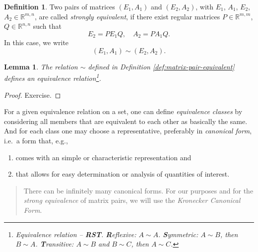 \documentclass[]{book}
\providecommand{\tightlist}{%
  \setlength{\itemsep}{0pt}\setlength{\parskip}{0pt}}
\newenvironment {JHSAYS} [0] {\begin{quote}\color{jhsc}} {\end{quote}}
\newtheorem{lemma}{Lemma}[chapter]
\theoremstyle{definition}
\newtheorem{definition}{Definition}[chapter]
\theoremstyle{definition}
\theoremstyle{definition}
\theoremstyle{remark}
\begin{document}
\begin{definition}
\protect\hypertarget{def:matrix-pair-equivalent}{}{\label{def:matrix-pair-equivalent} }Two pairs of matrices \((E_1, A_1)\) and \((E_2, A_2)\), with \(E_1\), \(A_1\), \(E_2\), \(A_2 \in \mathbb R^{m,n}\), are called \emph{strongly equivalent}, if there exist regular matrices \(P\in \mathbb R^{m,m}\), \(Q\in \mathbb R^{n,n}\) such that
\begin{equation*}
E_2 = PE_1Q, \quad A_2 = PA_1Q.
\end{equation*}
In this case, we write
\[(E_1, A_1) \sim (E_2, A_2).\]
\end{definition}

\begin{lemma}
\protect\hypertarget{lem:strong-equivalence-RSI}{}{\label{lem:strong-equivalence-RSI} }The relation \(\sim\) defined in Definition \ref{def:matrix-pair-equivalent} defines an equivalence relation\footnote{Equivalence relation -- \textbf{RST}. \textbf{R}eflexive: \(A\sim A\). \textbf{S}ymmetric: \(A\sim B\), then \(B\sim A\). \textbf{T}ransitive: \(A\sim B\) and \(B\sim C\), then \(A\sim C\).}.
\end{lemma}
\begin{proof}
{}Exercise.
\end{proof}

For a given equivalence relation on a set, one can define \emph{equivalence classes} by considering all members that are equivalent to each other as basically the same. And for each class one may choose a representative, preferably in \emph{canonical form}, i.e.~a form that, e.g.,

\begin{enumerate}
\def\labelenumi{\arabic{enumi}.}
\tightlist
\item
  comes with an simple or characteristic representation and
\item
  that allows for easy determination or analysis of quantities of interest.
\end{enumerate}

\begin{JHSAYS}
There can be infinitely many canonical forms. For our purposes and for
the \emph{strong equivalence} of matrix pairs, we will use the
\emph{Kronecker Canonical Form}.
\end{JHSAYS}
\end{document}
